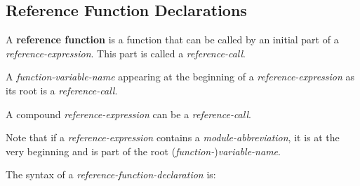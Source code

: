 \documentclass[12pt]{article}
\newcommand{\key}[1]{{\rm \bfseries #1}}
\begin{document}
\subsection{Reference Function Declarations}
\label{REFERENCE-FUNCTION-DECLARATIONS}

A \key{reference function} is a function that can be
called by an initial part of a {\em reference-expression}.
This part is called a {\em reference-call}\label{REFERENCE-CALL}.


A {\em function-variable-name} appearing at the beginning of
a {\em reference-expression} as its root is a {\em reference-call}.

A compound {\em reference-expression} can be a {\em reference-call}.

Note that if a {\em reference-expression} contains a
{\em module-abbreviation}, it is at the very beginning and
is part of the root ({\em function-}){\em variable-name}.

The syntax of a {\em reference-function-declaration} is:
\end{document}
